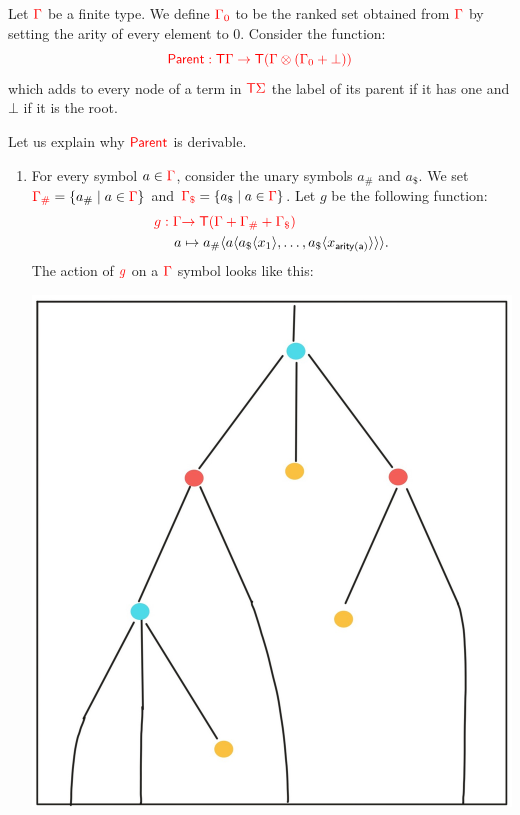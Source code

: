 \medskip
\noindent \begin{example}\label{ex:patternMatching} 
\end{example}


\medskip
\noindent \begin{example}  Let ${\color{red}{\Gamma}}$ be a finite type. We define ${\color{red}{{\color{red}{\Gamma}}_0}}$  to be the ranked set obtained from ${\color{red}{\Gamma}}$ by setting the arity of every element to $0$.  
\medskip
Consider the function:
$${\color{red}{ \mathsf{Parent}: {\color{red}{\mathsf T}}{\color{red}{\Gamma}}\to {\color{red}{\mathsf T}}({\color{red}{\Gamma}}\otimes ({\color{red}{\Gamma}}_0+\bot))}}$$
which adds to every node of a term in ${\color{red}{\mathsf T}} {\color{red}{\Sigma}}$ the label  of its parent if it has one and $\bot$ if it is the root.

Let us explain why ${\color{red}{\mathsf{Parent}}}$ is derivable. 
\begin{enumerate}
\item For every symbol $a\in {\color{red}{\Gamma}}$, consider the unary symbols $a_\#$ and $a_\$$.
We set ${\color{red}{{\color{red}{\Gamma}}_\#}}=\{a_\#\mid a\in{\color{red}{\Gamma}}\}$ and ${\color{red}{{\color{red}{\Gamma}}_\$}}=\{a_\$\mid a\in{\color{red}{\Gamma}}\}$.
Let $g$ be the following function:
 \begin{align*}
{\color{red}{  g: {\color{red}{\Gamma}}}} &{\color{red}{\to {\color{red}{\mathsf T}}({\color{red}{\Gamma}}+{\color{red}{\Gamma}}_\#+{\color{red}{\Gamma}}_\$)}}\\
  a &\mapsto a_\#\langle{a\langle{a_\$\langle{x_1}\rangle,\dots,a_\$\langle{x_{\mathsf{arity(a)}}}\rangle}\rangle}\rangle.
\end{align*}
The action of ${\color{red}{g}}$ on a ${\color{red}{\Gamma}}$ symbol looks like this:
\begin{center}
\includegraphics[scale=.15]{MyPic1.jpg}

\end{center}
\end{enumerate}
\end{example}
